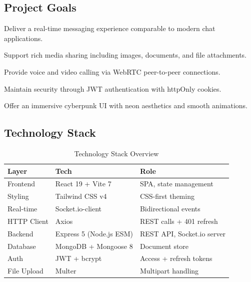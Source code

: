 \documentclass[12pt,a4paper]{article}
\begin{document}
\subsection{Project Goals}
\begin{compactitem}
    \item Deliver a real-time messaging experience comparable to modern chat applications.
    \item Support rich media sharing including images, documents, and file attachments.
    \item Provide voice and video calling via WebRTC peer-to-peer connections.
    \item Maintain security through JWT authentication with httpOnly cookies.
    \item Offer an immersive cyberpunk UI with neon aesthetics and smooth animations.
\end{compactitem}

\subsection{Technology Stack}
\label{sec:tech-stack}

\begin{table}[H]
    \centering
    \caption{Technology Stack Overview}
    \begin{tabular}{llp{6cm}}
        \toprule
        \textbf{Layer}    & \textbf{Tech}           & \textbf{Role} \\
        \midrule
        Frontend         & React 19 + Vite 7       & SPA, state management \\
        Styling         & Tailwind CSS v4          & CSS-first theming \\
        Real-time       & Socket.io-client         & Bidirectional events \\
        HTTP Client     & Axios                   & REST calls + 401 refresh \\
        Backend         & Express 5 (Node.js ESM) & REST API, Socket.io server \\
        Database        & MongoDB + Mongoose 8    & Document store \\
        Auth           & JWT + bcrypt            & Access + refresh tokens \\
        File Upload     & Multer                  & Multipart handling \\
        \bottomrule
    \end{tabular}
\end{table}
\end{document}

